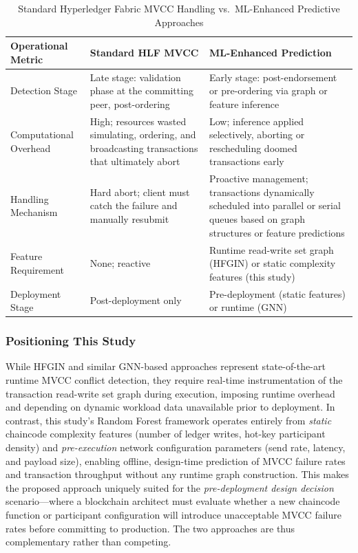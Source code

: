 \documentclass[manuscript,screen,nofonts]{acmart}
\begin{document}
\begin{table}[htbp]
\centering
\caption{Standard Hyperledger Fabric MVCC Handling vs.\ ML-Enhanced Predictive Approaches}
\label{tab:mvcc_comparison}
\small
\begin{tabular}{p{2.8cm}p{4.5cm}p{4.5cm}}
\hline
\textbf{Operational Metric} & \textbf{Standard HLF MVCC} & \textbf{ML-Enhanced Prediction} \\
\hline
Detection Stage & Late stage: validation phase at the committing peer, post-ordering \citep{debreczeni_transaction_2024} & Early stage: post-endorsement or pre-ordering via graph or feature inference \citep{alzahrani_hfgin_2025} \\
\hline
Computational Overhead & High; resources wasted simulating, ordering, and broadcasting transactions that ultimately abort \citep{alzahrani_hfgin_2025} & Low; inference applied selectively, aborting or rescheduling doomed transactions early \citep{alzahrani_hfgin_2025} \\
\hline
Handling Mechanism & Hard abort; client must catch the failure and manually resubmit \citep{debreczeni_transaction_2024} & Proactive management; transactions dynamically scheduled into parallel or serial queues based on graph structures or feature predictions \citep{alzahrani_hfgin_2025} \\
\hline
Feature Requirement & None; reactive & Runtime read-write set graph (HFGIN) or static complexity features (this study) \\
\hline
Deployment Stage & Post-deployment only & Pre-deployment (static features) or runtime (GNN) \\
\hline
\end{tabular}
\end{table}

\subsubsection{Positioning This Study}

While HFGIN and similar GNN-based approaches represent state-of-the-art runtime MVCC conflict detection, they require real-time instrumentation of the transaction read-write set graph during execution, imposing runtime overhead and depending on dynamic workload data unavailable prior to deployment. In contrast, this study's Random Forest framework operates entirely from \textit{static} chaincode complexity features (number of ledger writes, hot-key participant density) and \textit{pre-execution} network configuration parameters (send rate, latency, and payload size), enabling offline, design-time prediction of MVCC failure rates and transaction throughput without any runtime graph construction. This makes the proposed approach uniquely suited for the \textit{pre-deployment design decision} scenario---where a blockchain architect must evaluate whether a new chaincode function or participant configuration will introduce unacceptable MVCC failure rates before committing to production. The two approaches are thus complementary rather than competing.
\end{document}
